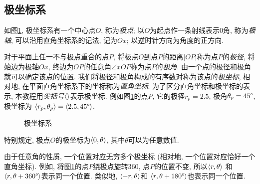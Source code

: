 \subsection{极坐标系}

如图\ref{fig:polar-coord-sys},
极坐标系有一个中心点$O$, 称为\emph{极点};
以$O$为起点作一条射线表示0\degree 角, 称为\emph{极轴},
可以沿用直角坐标系的记法, 记为$Ox$;
以逆时针方向为角度的正方向.

对于平面上任一不与极点重合的点$P$,
将极点$O$到点$P$的距离$|OP|$称为点$P$的\emph{极径},
将始边为极轴$Ox$, 终边为$OP$的任意角$\angle{xOP}$称为点$P$的\emph{极角}.
由一个点的极径和极角就可以确定该点的位置.
我们将极径和极角构成的有序数对称为该点的\emph{极坐标},
相对地, 在平面直角坐标系下的坐标称为\emph{直角坐标}.
为了区分直角坐标和极坐标的表示,
本教程用\emph{尖括号$\braket{}$}表示极坐标.
例如图\ref{fig:polar-coord-sys}的点$P$,
它的极径$r_p = 2.5$, 极角$\theta_p = 45\degree$,
极坐标为 $\braket{r_p,\theta_p} = \braket{2.5,45\degree}$.

\begin{figure}[htbp]
  \centering
  \caption{极坐标系}
  \label{fig:polar-coord-sys}
\end{figure}

特别规定, 极点$O$的极坐标为$\braket{0,\theta}$,
其中$\theta$可以为任意数值.

由于任意角的性质, 一个位置对应无穷多个极坐标
(相对地, 一个位置对应恰好一个直角坐标).
例如, 将图\ref{fig:polar-coord-sys}的点$P$绕极点旋转360\degree,
点$P$的位置不变, 所以$\braket{r,\theta}$
和$\braket{r,\theta+360\degree}$表示同一个位置.
类似地, $\braket{-r,\theta}$和
$\braket{r,\theta+180\degree}$也表示同一个位置.

